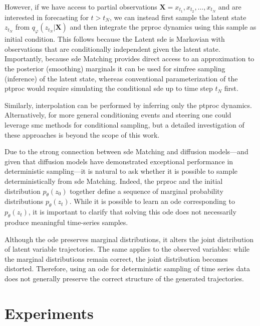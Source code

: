 \documentclass{article}
\def\X{\mathbf{X}}
\def\ph{\varphi}
\def\th{\theta}
\theoremstyle{plain}
\theoremstyle{definition}
\theoremstyle{remark}
\begin{document}
However, if we have access to partial observations $\X = {x_{t_1}, x_{t_2}, \dots, x_{t_N}}$ and are interested in forecasting for $t > t_N$, we can instead first sample the latent state $z_{t_N}$ from $q_\ph(z_{t_N}|\X)$ and then integrate the \gls{prproc} dynamics using this sample as initial condition. This follows because the Latent \gls{sde} is Markovian with observations that are conditionally independent given the latent state. Importantly, because \gls{sde} Matching provides direct access to an approximation to the posterior (smoothing) marginals it can be used for \gls{simfree} sampling (inference) of the latent state, whereas conventional parameterization of the \gls{ptproc} would require simulating the conditional \gls{sde} up to time step $t_N$ first.


Similarly, interpolation can be performed by inferring only the \gls{ptproc} dynamics. Alternatively, for more general conditioning events and steering one could leverage \gls{smc} methods \citep{naesseth2019elements,chopin2020introduction,wu2023practical} for conditional sampling, but a detailed investigation of these approaches is beyond the scope of this work.


Due to the strong connection between \gls{sde} Matching and diffusion models—and given that diffusion models have demonstrated exceptional performance in deterministic sampling—it is natural to ask whether it is possible to sample deterministically from \gls{sde} Matching. Indeed, the \gls{prproc} and the initial distribution $p_\th(z_0)$ together define a sequence of marginal probability distributions $p_\th(z_t)$. While it is possible to learn an \gls{ode} corresponding to $p_\th(z_t)$, it is important to clarify that solving this \gls{ode} does not necessarily produce meaningful time-series samples.


Although the \gls{ode} preserves marginal distributions, it alters the joint distribution of latent variable trajectories. The same applies to the observed variables: while the marginal distributions remain correct, the joint distribution becomes distorted. Therefore, using an \gls{ode} for deterministic sampling of time series data does not generally preserve the correct structure of the generated trajectories.


\section{Experiments}
\label{sec:experiments}
\end{document}
